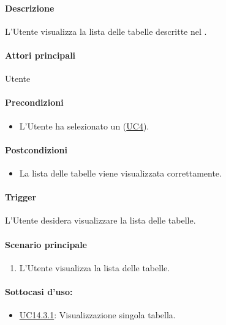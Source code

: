 \paragraph*{Descrizione}
L'Utente visualizza la lista delle tabelle descritte nel .

\paragraph*{Attori principali}
Utente

\paragraph*{Precondizioni}
\begin{itemize}
  \item L'Utente ha selezionato un  (\hyperref[UC4]{UC4}).
\end{itemize}

\paragraph*{Postcondizioni}
\begin{itemize}
  \item La lista delle tabelle viene visualizzata correttamente.
\end{itemize}

\paragraph*{Trigger}
L'Utente desidera visualizzare la lista delle tabelle.

\paragraph*{Scenario principale}
\begin{enumerate}
  \item L'Utente visualizza la lista delle tabelle.
\end{enumerate}

\paragraph*{Sottocasi d'uso:}
\begin{itemize}
  \item \hyperref[UC14point3point1]{UC14.3.1}: Visualizzazione singola tabella.
\end{itemize}

